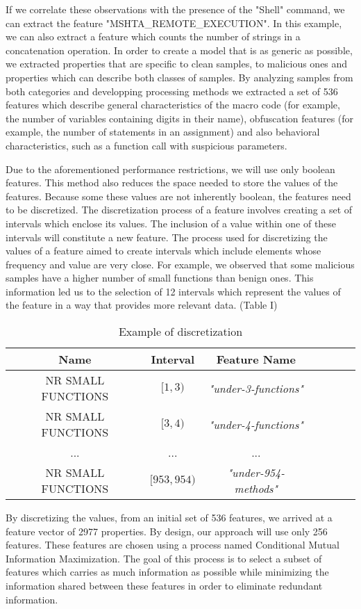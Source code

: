 If we correlate these observations with the presence of  the "Shell" command, we can extract the feature "MSHTA\_REMOTE\_EXECUTION". In this example, we can also extract a feature which counts the number of strings in a concatenation operation. In order to create a model that is as generic as possible, we extracted properties that are specific to clean samples, to malicious ones and properties which can describe both classes of samples. By analyzing samples from both categories and developping processing methods we extracted a set of 536 features which describe general characteristics of the macro code (for example, the number of variables containing digits in their name), obfuscation features (for example, the number of statements in an assignment) and also behavioral characteristics, such as a function call with suspicious parameters.
\par
Due to the aforementioned performance restrictions, we will use only boolean features. This method also reduces the space needed to store the values of the features. Because some these values are not inherently boolean, the features need to be discretized. The discretization process of a feature involves creating a set of intervals which enclose its values. The inclusion of a value within one of these intervals will constitute a new feature. The process used for discretizing the values of a feature aimed to create intervals which include elements whose frequency and value are very close.  For example, we observed that some malicious samples have a higher number of small functions than benign ones. This information led us to the selection of 12 intervals which represent the values of the feature in a way that provides more relevant data. (Table I)
\begin{table}[ht]
    \centering
    \begin{tabular}{| c | c | c | c | c | c | c | }
    \hline
    Name & Interval & Feature Name\\ \hline
    NR SMALL FUNCTIONS & $[1, 3)$ & \textit{"under-3-functions"}  \\ \hline
    NR SMALL FUNCTIONS & $[3, 4)$ & \textit{"under-4-functions"}  \\ \hline
    ... & ... & ... \\ \hline   
    NR SMALL FUNCTIONS & $[953, 954) $ & \textit{"under-954-methods"}  \\ \hline
    \end{tabular}
    \caption{Example of discretization} 
    \label{tab:discretizationeg}
\end{table}
\par
By discretizing the values, from an initial set of 536 features, we arrived at a feature vector of 2977 properties. By design, our approach will use only 256 features. These features are chosen using a process named Conditional Mutual Information Maximization\cite{fleuret}. The goal of this process is to select a subset of features which carries as much information as possible while minimizing the information shared between these features in order to eliminate redundant information.